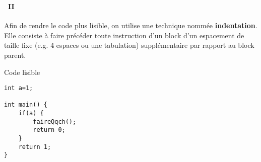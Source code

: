\begin{frame}[containsverbatim]
  \frametitle{\secname}
  \framesubtitle{\subsecname~II}
  Afin de rendre le code plus lisible, on utilise une technique nommée \textbf{indentation}. 
  Elle consiste à faire précéder toute instruction d'un block d'un espacement de taille fixe (e.g. 4 espaces ou une tabulation) supplémentaire par rapport au block parent.
  \begin{exampleblock}{Code lisible}
    \begin{verbatim}
int a=1;

int main() {
    if(a) {
        faireQqch();
        return 0;
    }
    return 1;
} \end{verbatim}
  \end{exampleblock}

  
\end{frame}

